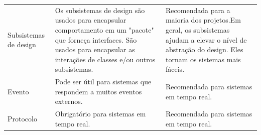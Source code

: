 \begin{table}[]
\begin{tabular}{lll}
Subsistemas de design                              & Os subsistemas de design são usados para encapsular comportamento em um "pacote" que forneça interfaces. São usados para encapsular as interações de classes e/ou outros subsistemas.                                                                                                                                                                                                                             & Recomendada para a maioria dos projetos.Em geral, os subsistemas ajudam a elevar o nível de abstração do design. Eles tornam os sistemas mais fáceis.                                                                                                                                                                                                                            \\
Evento                                             & Pode ser útil para sistemas que respondem a muitos eventos externos.                                                                                                                                                                                                                                                                                                                                              & Recomendada para sistemas em tempo real.                                                                                                                                                                                                                                                                                                                                         \\
Protocolo                                          & Obrigatório para sistemas em tempo real.                                                                                                                                                                                                                                                                                                                                                                          & Recomendada para sistemas em tempo real.                                                                                                                                                                                                                                                                                                                                         \\

\end{tabular}
\end{table}
